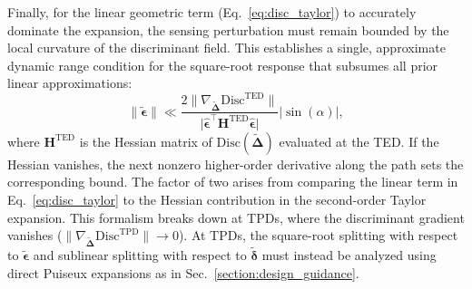 \documentclass[%
  reprint,
  amsmath,amssymb,
  aps,
  prapplied,
  superscriptaddress,
  longbibliography]{revtex4-2}
\begin{document}
Finally, for the linear geometric term (Eq.~\ref{eq:disc_taylor}) to accurately dominate the expansion, the sensing perturbation must remain bounded by the local curvature of the discriminant field. This establishes a single, approximate dynamic range condition for the square-root response that subsumes all prior linear approximations:
\begin{equation}\label{eq:ted_bound}
    \lVert\boldsymbol{\tilde{\epsilon}}\rVert \ll \frac{2\lVert\nabla_{\boldsymbol{\tilde{\Delta}}}\mathrm{Disc}^\text{TED}\rVert}{\lvert \boldsymbol{\hat{\epsilon}}^\top \mathbf{H}^\text{TED} \boldsymbol{\hat{\epsilon}} \rvert} |\sin(\alpha)|,
\end{equation}
where $\mathbf{H}^\text{TED}$ is the Hessian matrix of $\mathrm{Disc}(\boldsymbol{\tilde{\Delta}})$ evaluated at the TED. If the Hessian vanishes, the next nonzero higher-order derivative
along the path sets the corresponding bound. The factor of two arises from comparing the linear term in Eq.~\ref{eq:disc_taylor} to the Hessian contribution in the second-order Taylor expansion. This formalism breaks down at TPDs, where the discriminant gradient vanishes ($\lVert\nabla_{\boldsymbol{\tilde{\Delta}}}\mathrm{Disc}^\text{TPD}\rVert \to 0$). At TPDs, the square-root splitting with respect to $\boldsymbol{\tilde{\epsilon}}$ and sublinear splitting with respect to $\boldsymbol{\tilde{\delta}}$ must instead be analyzed using direct Puiseux expansions as in Sec.~\ref{section:design_guidance}.
\end{document}
